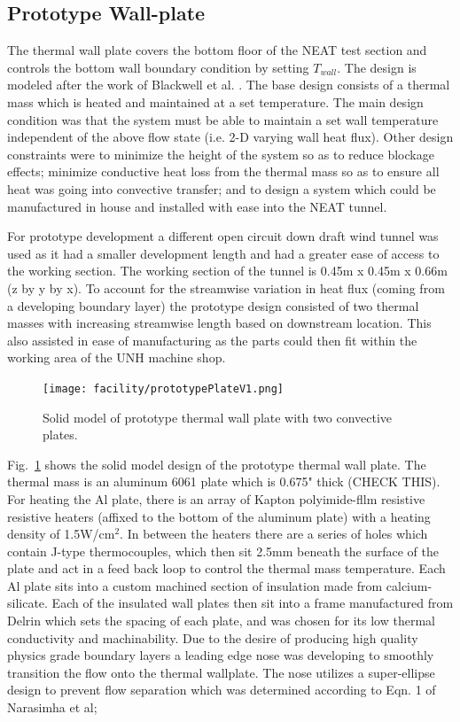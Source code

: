 \subsection{Prototype Wall-plate}
The thermal wall plate covers the bottom floor of the NEAT test section and controls the bottom wall boundary condition by setting $T_{wall}$.
The design is modeled after the work of Blackwell et al. \cite{Blackwell1972}.
The base design consists of a thermal mass which is heated and maintained at a set temperature.
The main design condition was that the system must be able to maintain a set wall temperature independent of the above flow state (i.e. 2-D varying wall heat flux).
Other design constraints were to minimize the height of the system so as to reduce blockage effects; minimize conductive heat loss from the thermal mass so as to ensure all heat was going into convective transfer; and to design a system which could be manufactured in house and installed with ease into the NEAT tunnel.

For prototype development a different open circuit down draft wind tunnel was used as it had a smaller development length and had a greater ease of access to the working section.
The working section of the tunnel is 0.45m x 0.45m x 0.66m (z by y by x).
To account for the streamwise variation in heat flux (coming from a developing boundary layer) the prototype design consisted of two thermal masses with increasing streamwise length based on downstream location.
This also assisted in ease of manufacturing as the parts could then fit within the working area of the UNH machine shop.\\

\begin{figure}[h!]
\centering
\texttt{[image: facility/prototypePlateV1.png]}
\caption{\footnotesize Solid model of prototype thermal wall plate with two convective plates.} 
\label{fig:prototype}
\end{figure}

Fig.~\ref{fig:prototype} shows the solid model design of the prototype thermal wall plate.
The thermal mass is an aluminum 6061 plate which is 0.675" thick (CHECK THIS).
For heating the Al plate, there is an array of Kapton polyimide-fllm resistive resistive heaters (affixed to the bottom of the aluminum plate) with a heating density of 1.5W/cm$^2$.
In between the heaters there are a series of holes which contain J-type thermocouples, which then sit 2.5mm beneath the surface of the plate and act in a feed back loop to control the thermal mass temperature.
Each Al plate sits into a custom machined section of insulation made from calcium-silicate.
Each of the insulated wall plates then sit into a frame manufactured from Delrin which sets the spacing of each plate, and was chosen for its low thermal conductivity and machinability.
Due to the desire of producing high quality physics grade boundary layers a leading edge nose was developing to smoothly transition the flow onto the thermal wallplate.
The nose utilizes a super-ellipse design to prevent flow separation \cite{R.Narasimha1994} which was determined according to Eqn. 1 of Narasimha et al;

